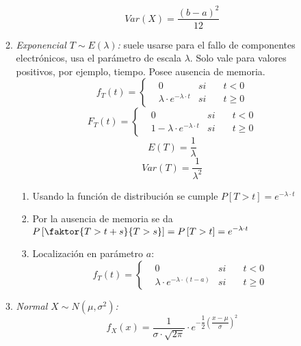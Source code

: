 \documentclass[a4paper, twocolumn, 10pt]{article}
\begin{document}
\begin{itemize}
\begin{enumerate}
		\begin{equation*}
			Var(X) = \frac{(b-a)^2}{12}
		\end{equation*}
		\item \textit{Exponencial $T\sim E(\lambda)$:} suele usarse para el fallo de componentes electrónicos, usa el parámetro de escala $\lambda$. Solo vale para valores positivos, por ejemplo, tiempo. Posee ausencia de memoria.
		\begin{equation*}
			f_T(t) = \left\lbrace
			\begin{aligned}
			& 0 & si \quad& t < 0 \\
			& \lambda\cdot e^{-\lambda \cdot t} & si \quad & t \ge 0
			\end{aligned} \right.
		\end{equation*}
		\begin{equation*}
			F_T(t) = \left\lbrace
			\begin{aligned}
			& 0 & si \quad& t < 0 \\
			& 1 - \lambda\cdot e^{-\lambda \cdot t} & si \quad & t \ge 0
			\end{aligned} \right.
		\end{equation*}
		\begin{equation*}
			E(T) = \frac{1}{\lambda}
		\end{equation*}
		\begin{equation*}
			Var(T) = \frac{1}{\lambda^2}
		\end{equation*}
		\begin{enumerate}
			\item Usando la función de distribución se cumple $P\left[T>t\right] = e^{-\lambda\cdot t}$
			\item Por la ausencia de memoria se da $\displaystyle P\left[\faktor{T > t+s}{T>s}\right] = P\left[T>t\right] = e^{-\lambda\cdot t}$
			\item Localización en parámetro $a$:
			\begin{equation*}
			f_T(t) = \left\lbrace
			\begin{aligned}
			& 0 & si \quad& t < 0 \\
			& \lambda\cdot e^{-\lambda \cdot (t-a)} & si \quad & t \ge 0
			\end{aligned} \right.
			\end{equation*}
		\end{enumerate}
		\item \textit{Normal $X\sim N(\mu, \sigma^2)$:}
		\begin{equation*}
			f_X(x) = \frac{1}{\sigma\cdot\sqrt{2\pi}}\cdot e^{-\dfrac{1}{2}\left(\dfrac{x-\mu}{\sigma}\right)^2}

\end{equation*}
\end{enumerate}
\end{itemize}
\end{document}
